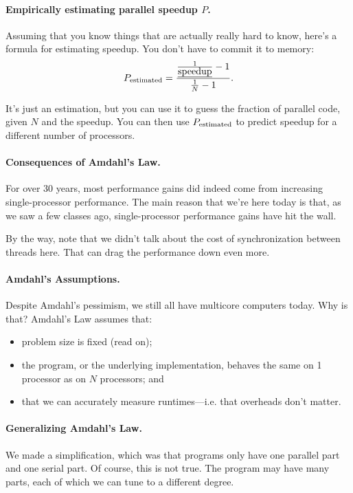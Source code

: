   \paragraph{Empirically estimating parallel speedup $P$.}
Assuming that you know things that are actually really hard to know, here's a formula for estimating speedup. You don't have to commit it to memory:
  \[P_{\mbox{\scriptsize estimated}} = \frac{\frac{1}{\mbox{\em speedup}}-1}{\frac{1}{N}-1}.\]

It's just an estimation, but you can use it to guess the fraction of parallel code, given $N$ and the speedup. You can then use $P_{\mbox{\scriptsize estimated}}$ to predict speedup for a different number of processors.

\paragraph{Consequences of Amdahl's Law.}
For over 30 years, most performance gains did indeed come from
increasing single-processor performance. The main reason that we're
here today is that, as we saw a few classes ago,
single-processor performance gains have hit the wall.

By the way, note that we didn't talk about the cost of synchronization
between threads here. That can drag the performance down even more.

\paragraph{Amdahl's Assumptions.}
Despite Amdahl's pessimism, we still all have multicore computers today.
Why is that? Amdahl's Law assumes that:
\begin{itemize}[noitemsep]
    \item problem size is fixed (read on);
    \item the program, or the underlying implementation, behaves the same on 1 processor as on $N$ processors; and
    \item that we can accurately measure runtimes---i.e. that overheads don't matter.
\end{itemize}

\paragraph{Generalizing Amdahl's Law.} We made a simplification,
which was that programs only have one parallel part and one serial part.
Of course, this is not true. The program may have many parts,
 each of which we can tune to a different degree.

